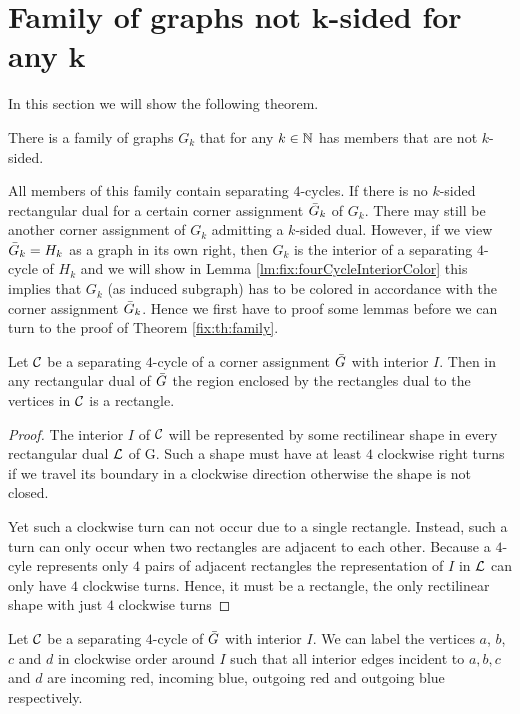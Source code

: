 
\section{Family of graphs not $\mathbf{k}$-sided for any $\mathbf{k}$}
\thispagestyle{plain}
  \label{s:fix}
  In this section we will show the following theorem.

  \begin{thrm}
    \label{fix:th:family}
      There is a family of graphs $G_k$ that for any $k \in \mathbb{N}$ has members that are not $k$-sided.
  \end{thrm}

  All members of this family contain separating $4$-cycles.
  If there is no $k$-sided rectangular dual for a certain corner assignment $\bar{G}_k$ of $G_k$. There may still be another corner assignment of $G_k$ admitting a $k$-sided dual.
  However, if we view $\bar{G}_k = H_k$ as a graph in its own right, then $G_k$ is the interior of a separating $4$-cycle of $H_k$ and we will show in Lemma \ref{lm:fix:fourCycleInteriorColor} this implies that $G_k$ (as induced subgraph) has to be colored in accordance with the corner assignment $\bar{G}_k$. Hence we first have to proof some lemmas before we can turn to the proof of Theorem \ref{fix:th:family}.

  \begin{lemma}
    \label{lm:interiorRectangle}
    Let $\mathcal{C}$ be a separating $4$-cycle of a corner assignment $\bar{G}$ with interior $I$. Then in any rectangular dual of $\bar{G}$ the region enclosed by the rectangles dual to the vertices in $\mathcal{C}$ is a rectangle.
  \end{lemma}
  \begin{proof}
    The interior $I$ of $\mathcal{C}$ will be represented by some rectilinear shape in every rectangular dual $\mathcal{L}$ of G. Such a shape must have at least $4$ clockwise right turns if we travel its boundary in a clockwise direction otherwise the shape is not closed.

    Yet such a clockwise turn can not occur due to a single rectangle. Instead, such a turn can only occur when two rectangles are adjacent to each other. Because a $4$-cyle represents only $4$ pairs of adjacent rectangles the representation of $I$ in $\mathcal{L}$ can only have $4$ clockwise turns. Hence, it must be a rectangle, the only rectilinear shape with just $4$ clockwise turns
  \end{proof}

  \begin{lemma}
  \label{lm:fix:fourCycleInteriorColor}
  Let $\mathcal{C}$ be a separating $4$-cycle of $\bar{G}$ with interior $I$. We can label the vertices $a$, $b$, $c$ and $d$ in clockwise order around $I$ such that all interior edges incident to $a, b, c$ and $d$ are incoming red, incoming blue, outgoing red and outgoing blue respectively.
  \end{lemma}

